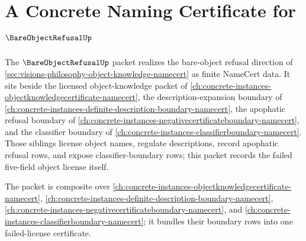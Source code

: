 \chapter{A Concrete Naming Certificate for $\BareObjectRefusalUp$}
\label{ch:concrete-instances-bareobjectrefusal-namecert}

The $\BareObjectRefusalUp$ packet realizes the bare-object refusal direction of \autoref{sec:visions-philosophy-object-knowledge-namecert} as finite NameCert data. It sits beside the licensed object-knowledge packet of \autoref{ch:concrete-instances-objectknowledgecertificate-namecert}, the description-expansion boundary of \autoref{ch:concrete-instances-definite-description-boundary-namecert}, the apophatic refusal boundary of \autoref{ch:concrete-instances-negativecertificateboundary-namecert}, and the classifier boundary of \autoref{ch:concrete-instances-classifierboundary-namecert}. Those siblings license object names, regulate descriptions, record apophatic refusal rows, and expose classifier-boundary rows; this packet records the failed five-field object license itself.

The packet is composite over \autoref{ch:concrete-instances-objectknowledgecertificate-namecert}, \autoref{ch:concrete-instances-definite-description-boundary-namecert}, \autoref{ch:concrete-instances-negativecertificateboundary-namecert}, and \autoref{ch:concrete-instances-classifierboundary-namecert}; it bundles their boundary rows into one failed-license certificate.

